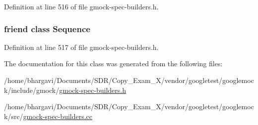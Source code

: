 Definition at line 516 of file gmock-\/spec-\/builders.\+h.

\subsubsection[{\texorpdfstring{Sequence}{Sequence}}]{\setlength{\rightskip}{0pt plus 5cm}friend class {\bf Sequence}\hspace{0.3cm}{\ttfamily [friend]}}\hypertarget{classtesting_1_1_expectation_a26271d5afaff6e6d3f00c055c63d0b24}{}\label{classtesting_1_1_expectation_a26271d5afaff6e6d3f00c055c63d0b24}


Definition at line 517 of file gmock-\/spec-\/builders.\+h.



The documentation for this class was generated from the following files\+:\begin{DoxyCompactItemize}
\item 
/home/bhargavi/\+Documents/\+S\+D\+R/\+Copy\+\_\+\+Exam\+\_\+X/vendor/googletest/googlemock/include/gmock/\hyperlink{gmock-spec-builders_8h}{gmock-\/spec-\/builders.\+h}\item 
/home/bhargavi/\+Documents/\+S\+D\+R/\+Copy\+\_\+\+Exam\+\_\+X/vendor/googletest/googlemock/src/\hyperlink{gmock-spec-builders_8cc}{gmock-\/spec-\/builders.\+cc}\end{DoxyCompactItemize}
